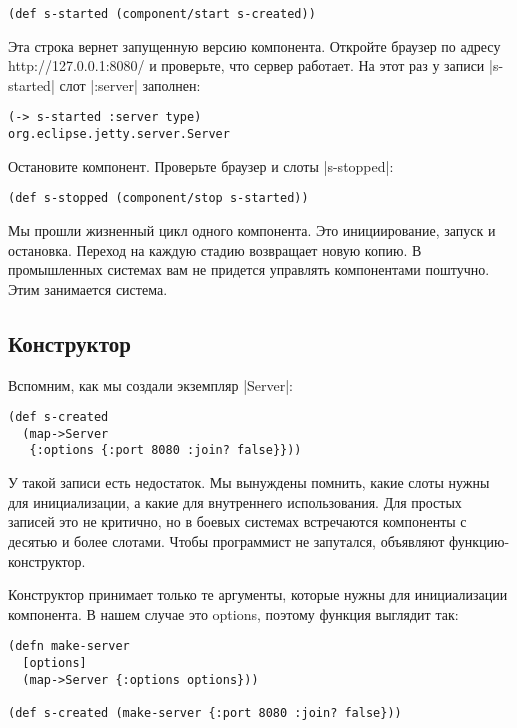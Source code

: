 \begin{verbatim}
(def s-started (component/start s-created))
\end{verbatim}

Эта строка вернет запущенную версию компонента. Откройте браузер по адресу
http://127.0.0.1:8080/ и проверьте, что сервер работает. На этот раз у записи
\spverb|s-started| слот \spverb|:server| заполнен:

\begin{verbatim}
(-> s-started :server type)
org.eclipse.jetty.server.Server
\end{verbatim}

Остановите компонент. Проверьте браузер и слоты \spverb|s-stopped|:

\begin{verbatim}
(def s-stopped (component/stop s-started))
\end{verbatim}

Мы прошли жизненный цикл одного компонента. Это инициирование, запуск и
остановка. Переход на каждую стадию возвращает новую копию. В промышленных
системах вам не придется управлять компонентами поштучно. Этим занимается
система.

\subsection{Конструктор}

Вспомним, как мы создали экземпляр \spverb|Server|:

\begin{verbatim}
(def s-created
  (map->Server
   {:options {:port 8080 :join? false}}))
\end{verbatim}

У такой записи есть недостаток. Мы вынуждены помнить, какие слоты нужны для
инициализации, а какие для внутреннего использования. Для простых записей это не
критично, но в боевых системах встречаются компоненты с десятью и более
слотами. Чтобы программист не запутался, объявляют функцию-конструктор.

Конструктор принимает только те аргументы, которые нужны для инициализации
компонента. В нашем случае это options, поэтому функция выглядит так:

\begin{verbatim}
(defn make-server
  [options]
  (map->Server {:options options}))

(def s-created (make-server {:port 8080 :join? false}))
\end{verbatim}

